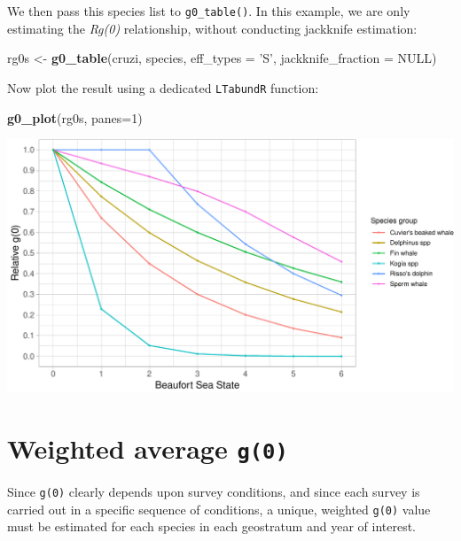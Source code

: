 \documentclass[
]{book}
\newenvironment{Shaded}{\begin{snugshade}}{\end{snugshade}}
\newcommand{\DataTypeTok}[1]{\textcolor[rgb]{0.13,0.29,0.53}{#1}}
\newcommand{\DecValTok}[1]{\textcolor[rgb]{0.00,0.00,0.81}{#1}}
\newcommand{\KeywordTok}[1]{\textcolor[rgb]{0.13,0.29,0.53}{\textbf{#1}}}
\newcommand{\NormalTok}[1]{#1}
\newcommand{\OtherTok}[1]{\textcolor[rgb]{0.56,0.35,0.01}{#1}}
\newcommand{\StringTok}[1]{\textcolor[rgb]{0.31,0.60,0.02}{#1}}
\begin{document}
We then pass this species list to \texttt{g0\_table()}. In this example, we are only estimating the \emph{Rg(0)} relationship, without conducting jackknife estimation:

\begin{Shaded}
\begin{Highlighting}[]
\NormalTok{rg0s <-}\StringTok{ }\KeywordTok{g0_table}\NormalTok{(cruzi,}
\NormalTok{               species,}
               \DataTypeTok{eff_types =} \StringTok{'S'}\NormalTok{,}
               \DataTypeTok{jackknife_fraction =} \OtherTok{NULL}\NormalTok{)}
\end{Highlighting}
\end{Shaded}

Now plot the result using a dedicated \texttt{LTabundR} function:

\begin{Shaded}
\begin{Highlighting}[]
\KeywordTok{g0_plot}\NormalTok{(rg0s, }\DataTypeTok{panes=}\DecValTok{1}\NormalTok{)}
\end{Highlighting}
\end{Shaded}

\includegraphics{figures/unnamed-chunk-148-1.pdf}

\hypertarget{weighted-average-g0}{%
\section*{\texorpdfstring{Weighted average \texttt{g(0)}}{Weighted average g(0)}}\label{weighted-average-g0}}

Since \texttt{g(0)} clearly depends upon survey conditions, and since each survey is carried out in a specific sequence of conditions, a unique, weighted \texttt{g(0)} value must be estimated for each species in each geostratum and year of interest.
\end{document}
